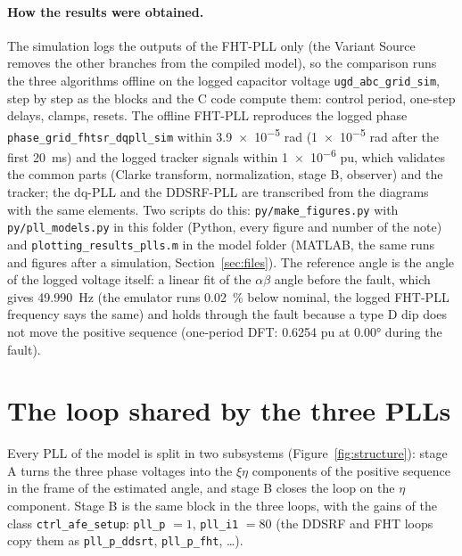 \documentclass[11pt,a4paper]{scrartcl}
\newcommand{\code}[1]{\texttt{#1}}
\begin{document}
\begin{onehalfspace}
\paragraph{How the results were obtained.} The simulation logs the outputs of the FHT-PLL only (the Variant Source removes the other branches from the compiled model), so the comparison runs the three algorithms offline on the logged capacitor voltage \code{ugd\_abc\_grid\_sim}, step by step as the blocks and the C code compute them: control period, one-step delays, clamps, resets. The offline FHT-PLL reproduces the logged phase \code{phase\_grid\_fhtsr\_dqpll\_sim} within \num{3.9e-5} rad (\num{1e-5} rad after the first \SI{20}{\milli\second}) and the logged tracker signals within \num{1e-6} pu, which validates the common parts (Clarke transform, normalization, stage B, observer) and the tracker; the dq-PLL and the DDSRF-PLL are transcribed from the diagrams with the same elements. Two scripts do this: \code{py/make\_figures.py} with \code{py/pll\_models.py} in this folder (Python, every figure and number of the note) and \code{plotting\_results\_plls.m} in the model folder (MATLAB, the same runs and figures after a simulation, Section~\ref{sec:files}). The reference angle is the angle of the logged voltage itself: a linear fit of the $\alpha\beta$ angle before the fault, which gives \SI{49.990}{\hertz} (the emulator runs \num{0.02}~\% below nominal, the logged FHT-PLL frequency says the same) and holds through the fault because a type D dip does not move the positive sequence (one-period DFT: \num{0.6254} pu at \ang{0.00} during the fault).

\section{The loop shared by the three PLLs}
\label{sec:loop}

Every PLL of the model is split in two subsystems (Figure~\ref{fig:structure}): stage A turns the three phase voltages into the $\xi\eta$ components of the positive sequence in the frame of the estimated angle, and stage B closes the loop on the $\eta$ component. Stage B is the same block in the three loops, with the gains of the class \code{ctrl\_afe\_setup}: \code{pll\_p} $= 1$, \code{pll\_i1} $= 80$ (the DDSRF and FHT loops copy them as \code{pll\_p\_ddsrt}, \code{pll\_p\_fht}, \ldots).


\end{onehalfspace}
\end{document}
